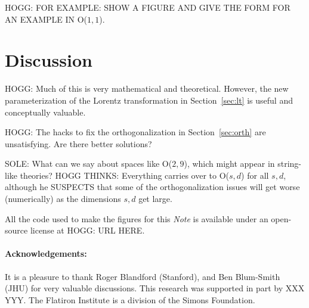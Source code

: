 \documentclass{article}
\newcommand{\documentname}{\textsl{Note}}
\newcommand{\secref}[1]{Section~\ref{#1}}
\begin{document}
HOGG: FOR EXAMPLE: SHOW A FIGURE AND GIVE THE FORM FOR AN EXAMPLE IN O($1,1$).

\section{Discussion}\label{sec:discussion}

HOGG: Much of this is very mathematical and theoretical.
However, the new parameterization of the Lorentz transformation in \secref{sec:lt} is useful and conceptually valuable.

HOGG: The hacks to fix the orthogonalization in \secref{sec:orth} are unsatisfying. Are there better solutions?

SOLE: What can we say about spaces like O($2,9$), which might appear in string-like theories?
HOGG THINKS: Everything carries over to O($s,d$) for all $s,d$, although he SUSPECTS that some of the orthogonalization issues will get worse (numerically) as the dimensions $s,d$ get large.

All the code used to make the figures for this \documentname{} is available under an open-source license at HOGG: URL HERE.

\paragraph{Acknowledgements:}
It is a pleasure to thank
  Roger Blandford (Stanford), and
  Ben Blum-Smith (JHU)
for very valuable discussions.
This research was supported in part by XXX YYY.
The Flatiron Institute is a division of the Simons Foundation.

\raggedright
\printbibliography
\end{document}
